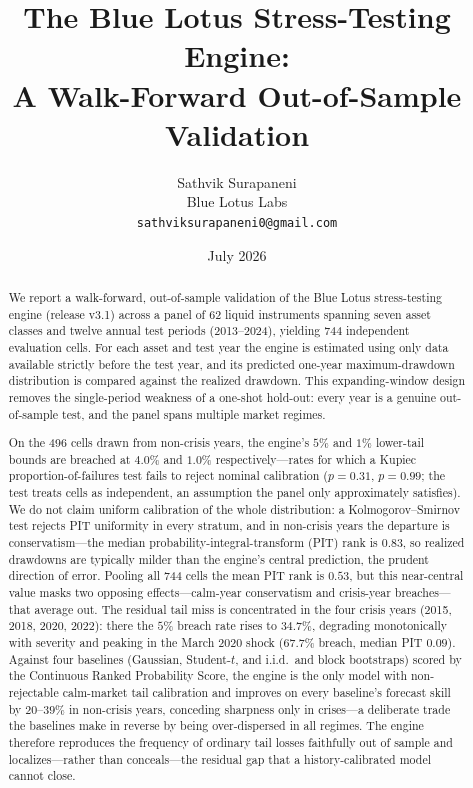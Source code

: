 \documentclass[11pt]{article}
\title{%
  \vspace{-1.2cm}
  \textbf{\Large The Blue Lotus Stress-Testing Engine:}\\[0.35em]
  \textbf{\Large A Walk-Forward Out-of-Sample Validation}
}
\author{%
  Sathvik Surapaneni\\[0.2em]
  \small Blue Lotus Labs\\[0.1em]
  \small \texttt{sathviksurapaneni0@gmail.com}
}
\date{July 2026}
\begin{document}
\maketitle
\thispagestyle{empty}

\begin{abstract}
\noindent
We report a walk-forward, out-of-sample validation of the Blue Lotus
stress-testing engine (release v3.1) across a panel of 62 liquid instruments
spanning seven asset classes and twelve annual test periods (2013--2024),
yielding 744 independent evaluation cells. For each asset and test year the
engine is estimated using only data available strictly before the test year,
and its predicted one-year maximum-drawdown distribution is compared against the
realized drawdown. This expanding-window design removes the single-period
weakness of a one-shot hold-out: every year is a genuine out-of-sample test, and
the panel spans multiple market regimes.

On the 496 cells drawn from non-crisis years, the engine's $5\%$ and $1\%$
lower-tail bounds are breached at $4.0\%$ and $1.0\%$ respectively---rates for
which a Kupiec proportion-of-failures test fails to reject nominal calibration
($p=0.31$, $p=0.99$; the test treats cells as independent, an assumption the panel
only approximately satisfies). We do not claim uniform calibration of the whole
distribution: a Kolmogorov--Smirnov test rejects PIT uniformity in every stratum,
and in non-crisis years the departure is conservatism---the median
probability-integral-transform (PIT) rank is $0.83$, so realized drawdowns are
typically milder than the engine's central prediction, the prudent direction of
error. Pooling all 744 cells the mean PIT rank is $0.53$, but this near-central
value masks two opposing effects---calm-year conservatism and crisis-year
breaches---that average out. The residual tail miss is concentrated in the four
crisis years (2015, 2018, 2020, 2022): there the $5\%$ breach rate rises to
$34.7\%$, degrading monotonically with severity and peaking in the March 2020
shock ($67.7\%$ breach, median PIT $0.09$). Against four baselines (Gaussian,
Student-$t$, and i.i.d.\ and block bootstraps) scored by the Continuous Ranked
Probability Score, the engine is the only model with non-rejectable calm-market
tail calibration and improves on every baseline's forecast skill by $20$--$39\%$
in non-crisis years, conceding sharpness only in crises---a deliberate trade the
baselines make in reverse by being over-dispersed in all regimes. The engine
therefore reproduces the frequency of ordinary tail losses faithfully out of
sample and localizes---rather than conceals---the residual gap that a
history-calibrated model cannot close.
\end{abstract}
\end{document}
